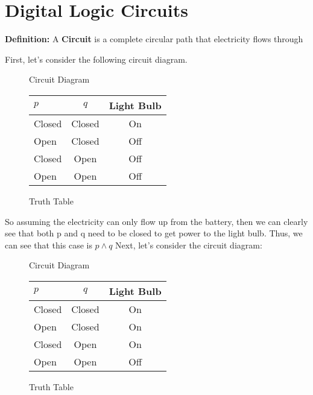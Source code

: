 \documentclass{report}
\begin{document}
    \section{Digital Logic Circuits}
    \begin{mdframed}
        \textbf{Definition:}
       A \textbf{Circuit} is a complete circular path that electricity flows through
    \end{mdframed}
    \bigbreak \noindent 
    First, let's consider the following circuit diagram.
    \bigbreak \noindent 
    \begin{figure}[ht]
    \begin{minipage}{0.47\textwidth}
        \centering
        \caption{Circuit Diagram}
        \label{fig:circuit1}
    \end{minipage}%
    \begin{minipage}{0.5\textwidth}
        \centering
        \begin{tabular}{|l|c||c|}
            \hline
            $p$ & $q$ & Light Bulb \\
            \hline
            Closed & Closed  &  On \\
            \hline
            Open & Closed  & Off\\
            \hline 
            Closed & Open  & Off\\
            \hline 
            Open & Open  & Off\\
            \hline
        \end{tabular}
        \caption{Truth Table}
        \label{fig:truth_table}
    \end{minipage}
\end{figure}
    \bigbreak \noindent 
    So assuming the electricity can only flow up from the battery, then we can clearly see that both p and q need to be closed to get power to the light bulb. Thus,
    we can see that this case is $p \land q$
    \bigbreak \noindent 
    Next, let's consider the circuit diagram:
    \bigbreak \noindent 
    \begin{figure}[ht]
    \begin{minipage}{0.47\textwidth}
        \centering
        \caption{Circuit Diagram}
        \label{fig2:cirtuit4}
    \end{minipage}
    \begin{minipage}{0.47\textwidth}
        \begin{center}
        \begin{tabular}{|l|c|c|}
        \hline
        $p$ & $q$  & Light Bulb \\
        	\hline
        Closed  & Closed & On  \\
        	\hline
        	Open & Closed & On\\ 
        	\hline 
        	Closed & Open & On\\
        	\hline 
        	Open & Open  & Off\\
        	\hline
        \end{tabular}
    \end{center}
    \caption{Truth Table}
    \label{fig2:truth_table}
    \end{minipage}
    \end{figure}
\end{document}
